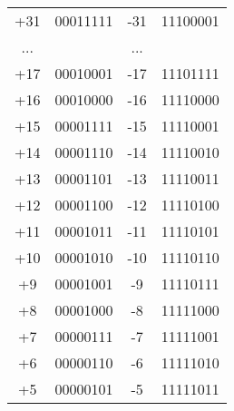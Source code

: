 \documentclass[12pt]{book}
\begin{document}
\begin{table}[H]
\begin{center}
\begin{tabular}{|c|c|c|c|}
+31  & 00011111                                                      & -31  & 11100001                                                      \\
...  &                                                               & ...  &                                                               \\
+17  & 00010001                                                      & -17  & 11101111                                                      \\
+16  & 00010000                                                      & -16  & 11110000                                                      \\
+15  & 00001111                                                      & -15  & 11110001                                                      \\
+14  & 00001110                                                      & -14  & 11110010                                                      \\
+13  & 00001101                                                      & -13  & 11110011                                                      \\
+12  & 00001100                                                      & -12  & 11110100                                                      \\
+11  & 00001011                                                      & -11  & 11110101                                                      \\
+10  & 00001010                                                      & -10  & 11110110                                                      \\
+9   & 00001001                                                      & -9   & 11110111                                                      \\
+8   & 00001000                                                      & -8   & 11111000                                                      \\
+7   & 00000111                                                      & -7   & 11111001                                                      \\
+6   & 00000110                                                      & -6   & 11111010                                                      \\
+5   & 00000101                                                      & -5   & 11111011                                                      \\

\end{tabular}
\end{center}
\end{table}
\end{document}
